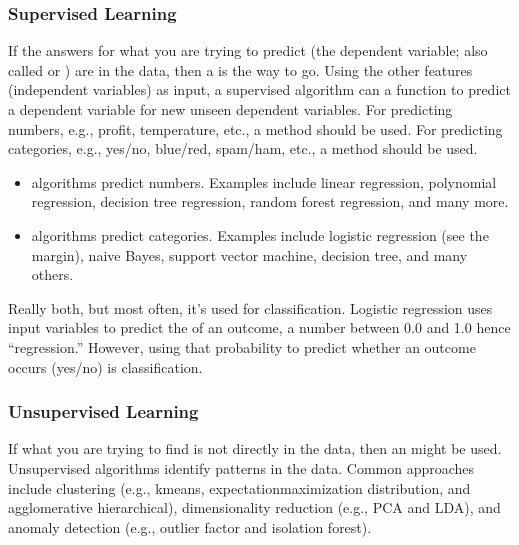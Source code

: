 \documentclass[letterpaper,10pt,english]{jupyterBook}
\begin{document}
\subsubsection{Supervised Learning}
\label{\detokenize{task1:supervised-learning}}
\sphinxAtStartPar
If the answers for what you are trying to predict (the dependent variable; also called  or ) are in the data, then a  is the way to go. Using the other features (independent variables) as input, a supervised algorithm can  a function to predict a dependent variable for new unseen dependent variables. For predicting numbers, e.g., profit, temperature, etc., a  method should be used. For predicting categories, e.g., yes/no, blue/red, spam/ham, etc., a  method should be used.
\begin{itemize}
\item {} 
\sphinxAtStartPar
{} algorithms predict numbers. Examples include linear regression, polynomial regression, decision tree regression, random forest regression, and many more.

\end{itemize}


\begin{itemize}
\item {} 
\sphinxAtStartPar
{} algorithms predict categories. Examples include logistic regression (see the margin), naive Bayes, support vector machine, decision tree, and many others.

\end{itemize}
\label{\detokenize{task1:task1-choosing-topic-logistic}}
\begin{sphinxShadowBox}

\sphinxAtStartPar
Really both, but most often, it’s used for classification. Logistic regression uses input variables to predict the  of an outcome, a number between 0.0 and 1.0 \sphinxhyphen{}hence “regression.” However, using that probability to predict whether an outcome occurs (yes/no) is classification.
\end{sphinxShadowBox}


\subsubsection{Unsupervised Learning}
\label{\detokenize{task1:unsupervised-learning}}
\sphinxAtStartPar
If what you are trying to find is not directly in the data, then an  might be used. Unsupervised algorithms identify patterns in the data. Common approaches include clustering (e.g., k\sphinxhyphen{}means, expectation\sphinxhyphen{}maximization distribution, and agglomerative hierarchical), dimensionality reduction (e.g., PCA and LDA), and anomaly detection (e.g., outlier factor and isolation forest).
\end{document}
